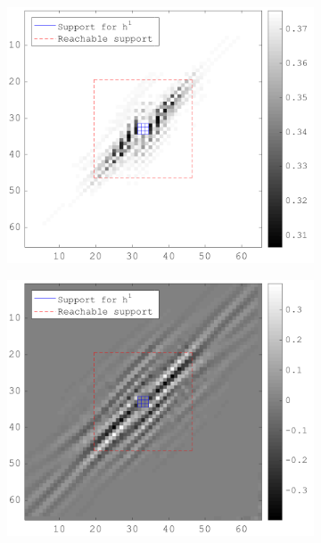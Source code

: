 \begin{figure}[!h]
\begin{subfigure}[b]{0.49\textwidth}
\end{subfigure}
    \begin{subfigure}[b]{0.49\textwidth}\centering
    \includegraphics[width=\textwidth]{figures/xp/xp_128x128_sc2_angl1_K3_S3_node1_obj_matrix.png}
    \end{subfigure}
    \begin{subfigure}[b]{0.49\textwidth}\centering
    \includegraphics[width=\textwidth]{figures/xp/xp_128x128_sc2_angl1_K3_S3_node1_gradient_node_1.png}
    \end{subfigure}
\end{figure}

